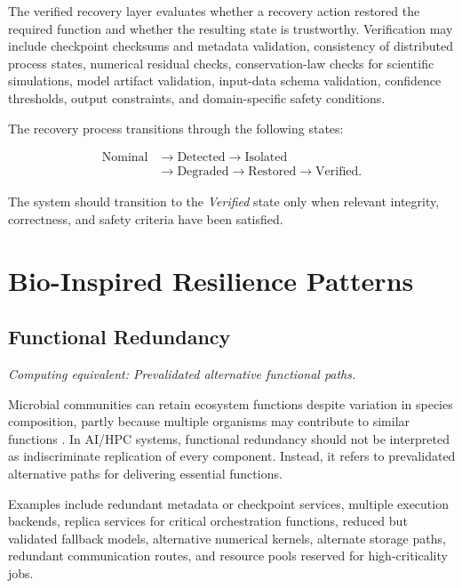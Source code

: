 \documentclass[conference]{IEEEtran}
\begin{document}
The verified recovery layer evaluates whether a recovery action restored the required function and whether the resulting state is trustworthy. Verification may include checkpoint checksums and metadata validation, consistency of distributed process states, numerical residual checks, conservation-law checks for scientific simulations, model artifact validation, input-data schema validation, confidence thresholds, output constraints, and domain-specific safety conditions.

The recovery process transitions through the following states:

\begin{equation}
\begin{aligned}
\text{Nominal}
&\rightarrow \text{Detected}
\rightarrow \text{Isolated} \\
&\rightarrow \text{Degraded}
\rightarrow \text{Restored}
\rightarrow \text{Verified}.
\end{aligned}
\label{eq:recovery-states}
\end{equation}

The system should transition to the \emph{Verified} state only when relevant integrity, correctness, and safety criteria have been satisfied.

\section{Bio-Inspired Resilience Patterns}

\subsection{Functional Redundancy}

\emph{Computing equivalent: Prevalidated alternative functional paths.}

Microbial communities can retain ecosystem functions despite variation in species composition, partly because multiple organisms may contribute to similar functions \cite{allison2008}. In AI/HPC systems, functional redundancy should not be interpreted as indiscriminate replication of every component. Instead, it refers to prevalidated alternative paths for delivering essential functions.

Examples include redundant metadata or checkpoint services, multiple execution backends, replica services for critical orchestration functions, reduced but validated fallback models, alternative numerical kernels, alternate storage paths, redundant communication routes, and resource pools reserved for high-criticality jobs.
\end{document}
